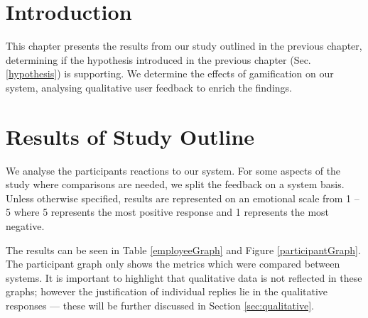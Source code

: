 \section{Introduction}
This chapter presents the results from our study outlined in the previous chapter, determining if the hypothesis introduced in the previous chapter (Sec. \ref{hypothesis}) is supporting. We determine the effects of gamification on our system, analysing qualitative user feedback to enrich the findings.
\section{Results of Study Outline}
We analyse the participants reactions to our system. For some aspects of the study where comparisons are needed, we split the feedback on a system basis. Unless otherwise specified, results are represented on an emotional scale from 1 -- 5 where 5 represents the most positive response and 1 represents the most negative.

The results can be seen in Table \ref{employeeGraph} and Figure \ref{participantGraph}. The participant graph only shows the metrics which were compared between systems. It is important to highlight that qualitative data is not reflected in these graphs; however the justification of individual replies lie in the qualitative responses --- these will be further discussed in Section \ref{sec:qualitative}.

\begin{table}[h]
     \caption{A table depicting the different type of loyalty schemes available at the locations the study was run in}
     \label{employeeGraph}
\end{table}


